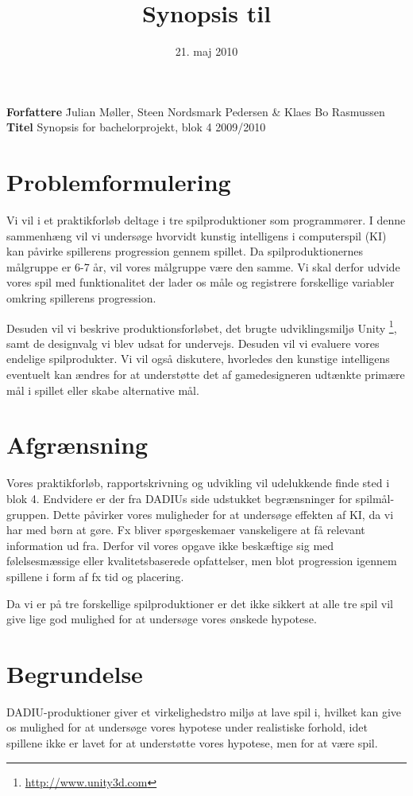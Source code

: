 \documentclass[10pt,a4paper,danish]{article}
\title{Synopsis til \thetitle}
\date{21. maj 2010}
\author{\theauthors}
\newcommand{\thetitle}{Synopsis for bachelorprojekt, blok 4 2009/2010}
\newcommand{\theauthors}{Julian Møller, Steen Nordsmark Pedersen \& Klaes Bo Rasmussen}
\begin{document}
\begin{tabbing}
\textbf{Forfattere} \= \theauthors \\
\textbf{Titel} \> \thetitle
\end{tabbing}

\section{Problemformulering}
\label{sec:Problemformulering}
Vi vil i et praktikforløb deltage i tre spilproduktioner som programmører. I
denne sammenhæng vil vi undersøge hvorvidt kunstig intelligens i computerspil
(KI) kan påvirke spillerens progression gennem spillet. Da spilproduktionernes
målgruppe er 6-7 år, vil vores målgruppe være den samme. Vi skal derfor udvide
vores spil med funktionalitet der lader os måle og registrere forskellige
variabler omkring spillerens progression.

Desuden vil vi beskrive produktionsforløbet, det brugte udviklingsmiljø Unity
\footnote{\url{http://www.unity3d.com}}, samt de designvalg vi blev udsat for
undervejs. Desuden vil vi evaluere vores endelige spilprodukter. Vi vil også
diskutere, hvorledes den kunstige intelligens eventuelt kan ændres for at
understøtte det af gamedesigneren udtænkte primære mål i spillet eller skabe
alternative mål.

\section{Afgrænsning}
\label{sec:Afgraensning}
Vores praktikforløb, rapportskrivning og udvikling vil udelukkende finde sted
i blok 4. Endvidere er der fra DADIUs side udstukket begrænsninger for spilmål-
gruppen. Dette påvirker vores muligheder for at undersøge effekten af KI, da vi har
med børn at gøre. Fx bliver spørgeskemaer vanskeligere at få relevant information
ud fra. Derfor vil vores opgave ikke beskæftige sig med følelsesmæssige eller
kvalitetsbaserede opfattelser, men blot progression igennem spillene i form af fx
tid og placering.

Da vi er på tre forskellige spilproduktioner er det ikke sikkert at alle tre
spil vil give lige god mulighed for at undersøge vores ønskede hypotese.

\section{Begrundelse}
\label{sec:Begrundelse}
DADIU-produktioner giver et virkelighedstro miljø at lave spil i, hvilket kan
give os mulighed for at undersøge vores hypotese under realistiske forhold,
idet spillene ikke er lavet for at understøtte vores hypotese, men for at være
spil.
\end{document}
